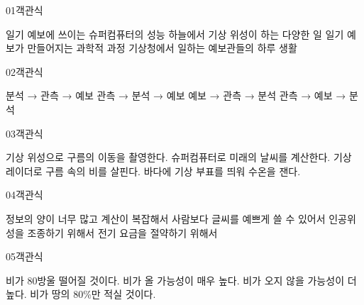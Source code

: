\documentclass[fs11,seriesFre]{korfarm-base}
\begin{document}

\begin{kfQBlock}{01}{객관식}
\begin{kfChoices}
\kfChoice 일기 예보에 쓰이는 슈퍼컴퓨터의 성능
\kfChoice 하늘에서 기상 위성이 하는 다양한 일
\kfChoice 일기 예보가 만들어지는 과학적 과정
\kfChoice 기상청에서 일하는 예보관들의 하루 생활
\end{kfChoices}
\end{kfQBlock}
\begin{kfQBlock}{02}{객관식}
\begin{kfChoices}
\kfChoice 분석 → 관측 → 예보
\kfChoice 관측 → 분석 → 예보
\kfChoice 예보 → 관측 → 분석
\kfChoice 관측 → 예보 → 분석
\end{kfChoices}
\end{kfQBlock}
\begin{kfQBlock}{03}{객관식}
\begin{kfChoices}
\kfChoice 기상 위성으로 구름의 이동을 촬영한다.
\kfChoice 슈퍼컴퓨터로 미래의 날씨를 계산한다.
\kfChoice 기상 레이더로 구름 속의 비를 살핀다.
\kfChoice 바다에 기상 부표를 띄워 수온을 잰다.
\end{kfChoices}
\end{kfQBlock}
\begin{kfQBlock}{04}{객관식}
\begin{kfChoices}
\kfChoice 정보의 양이 너무 많고 계산이 복잡해서
\kfChoice 사람보다 글씨를 예쁘게 쓸 수 있어서
\kfChoice 인공위성을 조종하기 위해서
\kfChoice 전기 요금을 절약하기 위해서
\end{kfChoices}
\end{kfQBlock}
\begin{kfQBlock}{05}{객관식}
\begin{kfChoices}
\kfChoice 비가 80방울 떨어질 것이다.
\kfChoice 비가 올 가능성이 매우 높다.
\kfChoice 비가 오지 않을 가능성이 더 높다.
\kfChoice 비가 땅의 80\%만 적실 것이다.
\end{kfChoices}
\end{kfQBlock}


\end{document}
